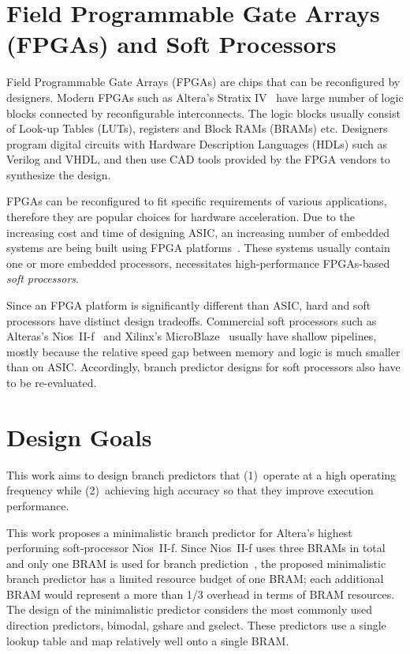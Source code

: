 \section{Field Programmable Gate Arrays (FPGAs) and Soft Processors}
\label{sec:background:fpga}
Field Programmable Gate Arrays (FPGAs) are chips that can be reconfigured by designers. Modern FPGAs such as Altera's Stratix IV~\cite{StratixIV} have large number of logic blocks connected by reconfigurable interconnects. The logic blocks usually consist of Look-up Tables (LUTs), registers and Block RAMs (BRAMs) etc. Designers program digital circuits with Hardware Description Languages (HDLs) such as Verilog and VHDL, and then use CAD tools provided by the FPGA vendors to synthesize the design.

FPGAs can be reconfigured to fit specific requirements of various applications, therefore they are popular choices for hardware acceleration. Due to the increasing cost and time of designing ASIC, an increasing number of embedded systems are being built using FPGA platforms~\cite{softprocessor}. These systems usually contain one or more embedded processors, necessitates high-performance FPGAs-based \textit{soft processors}. 

Since an FPGA platform is significantly different than ASIC, hard and soft processors have distinct design tradeoffs. Commercial soft processors such as Alteras's Nios~II-f~\cite{niosiif} and Xilinx's MicroBlaze~\cite{microblaze} usually have shallow pipelines, mostly because the relative speed gap between memory and logic is much smaller than on ASIC. Accordingly, branch predictor designs for soft processors also have to be re-evaluated.


\section{Design Goals}
\label{sec:background:goal}

This work aims to design branch predictors that (1)~operate at a high operating frequency while (2)~achieving high accuracy so that they improve execution performance.

This work proposes a minimalistic branch predictor for Altera's highest performing soft-processor Nios~II-f. Since Nios~II-f uses three BRAMs in total and only one BRAM is used for branch prediction~\cite{niosiif}, the proposed minimalistic branch predictor has a limited resource budget of one BRAM; each additional BRAM would represent a more than 1/3 overhead in terms of BRAM resources. The design of the minimalistic predictor considers the most commonly used direction predictors, bimodal, gshare and gselect. These predictors use a single lookup table and map relatively well onto a single BRAM.


